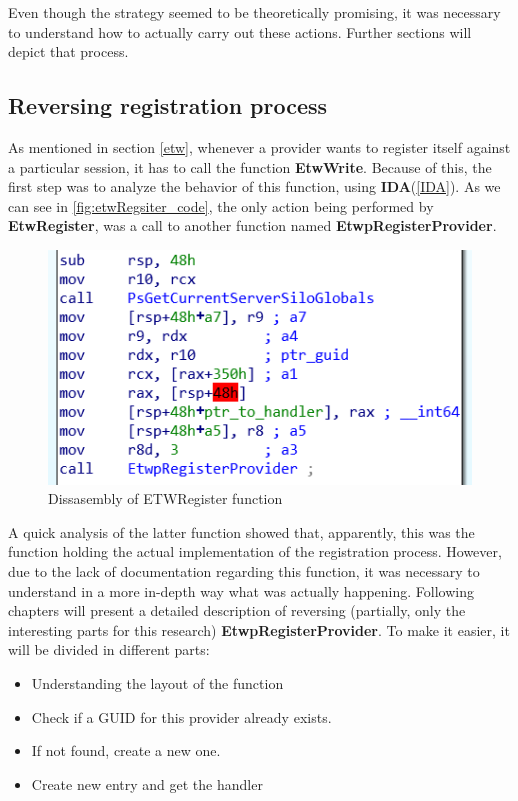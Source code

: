 Even though the strategy seemed to be theoretically promising, it was necessary to understand how to actually carry out these actions. Further sections will depict that process.










\subsection{Reversing registration process}
As mentioned in section \ref{etw}, whenever a provider wants to register itself against a particular session, it has to call the function {\bfseries EtwWrite}.
Because of this, the first step was to analyze the behavior of this function, using {\bfseries IDA}(\ref{IDA}). As we can see in \ref{fig:etwRegsiter_code}, the only action being performed by {\bfseries EtwRegister}, was a call to another function named {\bfseries EtwpRegisterProvider}. 

\begin{centering}
\begin{figure}[H]
  \includegraphics[width=12cm]{images/etwRegister_code.png}
  \caption[]{Dissasembly of ETWRegister function}
  \label{fig:etwRegister_code}
\end{figure}
\end{centering}

A quick analysis of the latter function showed that, apparently, this was the function holding the actual implementation of the registration process. However, due to the lack of documentation regarding this function, it was necessary to understand in a more in-depth way what was actually happening. Following chapters will present a detailed description of reversing (partially, only the interesting parts for this research) {\bfseries EtwpRegisterProvider}. 
To make it easier, it will be divided in different parts:
\begin{itemize}
  \item Understanding the layout of the function
  \item Check if a GUID for this provider already exists.
  \item If not found, create a new one.
  \item Create new entry and get the handler 
\end{itemize}


